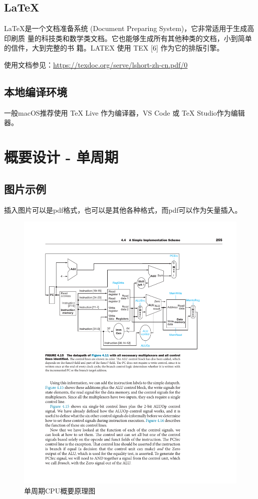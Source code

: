 \documentclass[UTF8,a4paper,autofakebold,15pt]{ctexart}
\begin{document}
\subsection{\LaTeX}
	\LaTeX 是一个文档准备系统 (Document Preparing System)，它非常适用于生成高印刷质 量的科技类和数学类文档。它也能够生成所有其他种类的文档，小到简单的信件，大到完整的书 籍。LATEX 使用 TEX [6] 作为它的排版引擎。

	使用文档参见：\href{https://texdoc.org/serve/lshort-zh-cn.pdf/0}{https://texdoc.org/serve/lshort-zh-cn.pdf/0}

\subsection{本地编译环境}

	一般macOS推荐使用 TeX Live 作为编译器，VS Code 或 TeX Studio作为编辑器。


\newpage

\section{概要设计 - 单周期}

\subsection{图片示例}

插入图片可以是pdf格式，也可以是其他各种格式，而pdf可以作为矢量插入。

\begin{figure}[ht]
	\centering
	\includegraphics{fig1.pdf}
	\caption{单周期CPU概要原理图\cite{ref1}}
	\label{fig:label1}
\end{figure}
\end{document}
